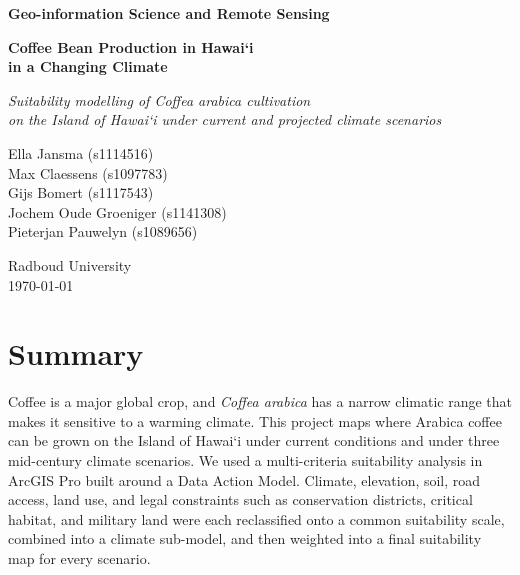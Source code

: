 \documentclass[12pt,a4paper]{article}
\newcommand{\okina}{\textquoteleft}
\begin{document}

\begin{titlepage}
  \centering
  \vspace*{2cm}
  {\Large\bfseries Geo-information Science and Remote Sensing\par}
  \vspace{2cm}
  {\LARGE\bfseries Coffee Bean Production in Hawai\okina i\\[0.3em]
  in a Changing Climate\par}
  \vspace{1.5cm}
  {\large\itshape Suitability modelling of \textit{Coffea arabica} cultivation\\[0.2em]
  on the Island of Hawai\okina i under current and projected climate scenarios\par}
  \vspace{2cm}
  {\normalsize
  Ella Jansma (s1114516)\\[0.2em]
  Max Claessens (s1097783)\\[0.2em]
  Gijs Bomert (s1117543)\\[0.2em]
  Jochem Oude Groeniger (s1141308)\\[0.2em]
  Pieterjan Pauwelyn (s1089656)\par}
  \vspace{1.5cm}
  {\normalsize Radboud University\\[0.2em]
  \today\par}
\end{titlepage}

\newpage
\section*{Summary}

Coffee is a major global crop, and \textit{Coffea arabica} has a narrow climatic range that makes it sensitive to a warming climate. This project maps where Arabica coffee can be grown on the Island of Hawai\okina i under current conditions and under three mid-century climate scenarios. We used a multi-criteria suitability analysis in ArcGIS Pro built around a Data Action Model. Climate, elevation, soil, road access, land use, and legal constraints such as conservation districts, critical habitat, and military land were each reclassified onto a common suitability scale, combined into a climate sub-model, and then weighted into a final suitability map for every scenario.
\end{document}
